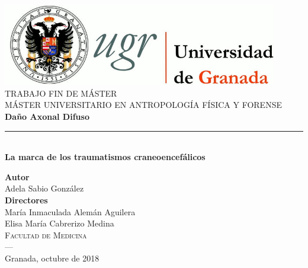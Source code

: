 \begin{titlepage}
 
 
\newlength{\centeroffset}
\setlength{\centeroffset}{-0.5\oddsidemargin}
\addtolength{\centeroffset}{0.5\evensidemargin}
\thispagestyle{empty}

\noindent\hspace*{\centeroffset}\begin{minipage}{\textwidth}

\centering
\includegraphics[width=0.9\textwidth]{imagenes/logo_ugr.jpg}\\[1.4cm]

\textsc{ \Large TRABAJO FIN DE MÁSTER\\[0.2cm]}
\textsc{ MÁSTER UNIVERSITARIO EN ANTROPOLOGÍA FÍSICA Y FORENSE}\\[1cm]
% 
{\Huge\bfseries Daño Axonal Difuso\\
}
\noindent\rule[-1ex]{\textwidth}{3pt}\\[3.5ex]
{\large\bfseries La marca de los traumatismos craneoencefálicos}
\end{minipage}

\vspace{2.5cm}
\noindent\hspace*{\centeroffset}\begin{minipage}{\textwidth}
\centering

\textbf{Autor}\\ {Adela Sabio González}\\[2.5ex]
\textbf{Directores}\\
{María Inmaculada Alemán Aguilera\\
Elisa María Cabrerizo Medina}\\[2cm]
\textsc{Facultad de Medicina}\\
\textsc{---}\\
Granada, octubre de 2018
\end{minipage}
\end{titlepage}


